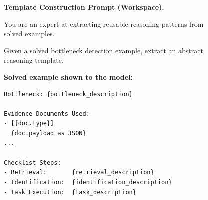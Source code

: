 \documentclass{llmxive}
\begin{document}
\begin{figure}[!t]
\centering
\begin{tcolorbox}[colback=gray!5, colframe=gray!50,
                  boxrule=0.5pt, arc=2mm,
                  left=4pt, right=4pt, top=3pt, bottom=3pt]
\small
\textbf{Template Construction Prompt (Workspace).}

You are an expert at extracting reusable reasoning patterns from solved examples.

Given a solved bottleneck detection example, extract an abstract reasoning template.

\medskip
\textbf{Solved example shown to the model:}
\begin{verbatim}
Bottleneck: {bottleneck_description}

Evidence Documents Used:
- [{doc.type}]
  {doc.payload as JSON}
...

Checklist Steps:
- Retrieval:       {retrieval_description}
- Identification:  {identification_description}
- Task Execution:  {task_description}
\end{verbatim}


\end{tcolorbox}
\end{figure}
\end{document}
